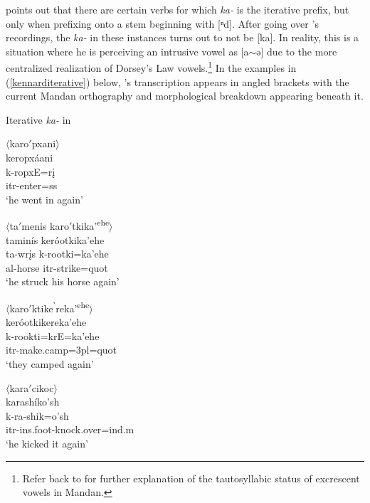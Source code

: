 \citet[11]{kennard1936} points out that there are certain verbs for which \textit{ka-} is the iterative prefix, but only when prefixing onto a stem beginning with [ⁿd]. After going over \citeauthor{hollow1970}'s recordings, the \textit{ka-} in these instances turns out to not be [ka]. In reality, this is a situation where he is perceiving an intrusive vowel as [a$\sim$ə] due to the more centralized realization of Dorsey's Law vowels.\footnote{Refer back to  for further explanation of the tautosyllabic status of excrescent vowels in Mandan.} In the examples in (\ref{kennarditerative}) below, \citeauthor{kennard1936}'s transcription appears in angled brackets with the current Mandan orthography and morphological breakdown appearing beneath it.

\begin{exe}
\item\label{kennarditerative} Iterative \textit{ka-} in \citet{kennard1936}

\begin{xlist}

\item $\langle$karo$'$pxani$\rangle$\\
    \glll keropxáani\\
    k-ropxE=rį\\
    itr-\textnormal{enter}=ss\\
    \glt `he went in again'

\item $\langle$ta$'$menis karo$'$tkika'\textsuperscript{ehe}$\rangle$\\
    \glll taminís keróotkika'ehe\\
    ta-wrįs k-rootki=ka'ehe\\
    al-\textnormal{horse} itr-\textnormal{strike}=quot\\
    \glt `he struck his horse again'

\item $\langle$karo$'$ktike\textsuperscript{$\backprime$}reka'\textsuperscript{ehe}$\rangle$\\
    \glll keróotkikereka'ehe\\
    k-rookti=krE=ka'ehe\\
    itr-\textnormal{make.camp}=3pl=quot\\
    \glt `they camped again'

\item $\langle$kara$'$cikoc$\rangle$\\
    \glll karashíko'sh\\
    k-ra-shik=o'sh\\
    itr-ins.foot-\textnormal{knock.over}=ind.m\\
	\glt `he kicked it again'

\end{xlist}

\end{exe}

